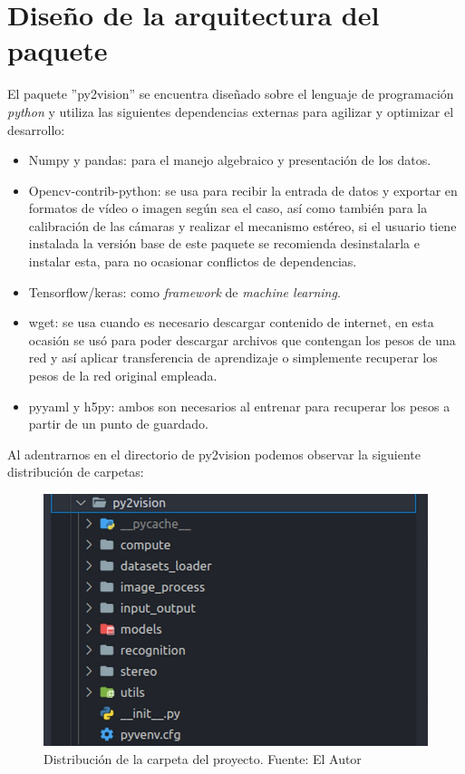 \section{Diseño de la arquitectura del paquete}
El paquete ''py2vision'' se encuentra diseñado sobre el lenguaje de programación \textit{python} y utiliza las siguientes dependencias externas para agilizar y optimizar el desarrollo:
\begin{itemize}
    \item Numpy y pandas: para el manejo algebraico y presentación de los datos.
    \item Opencv-contrib-python: se usa para recibir la entrada de datos y exportar en formatos de vídeo o imagen según sea el caso, así como también para la calibración de las cámaras y realizar el mecanismo estéreo, si el usuario tiene instalada la versión base de este paquete se recomienda desinstalarla e instalar esta, para no ocasionar conflictos de dependencias.
    \item Tensorflow/keras: como \textit{framework} de \textit{machine learning}.
    \item wget: se usa cuando es necesario descargar contenido de internet, en esta ocasión se usó para poder descargar archivos que contengan los pesos de una red y así aplicar transferencia de aprendizaje o simplemente recuperar los pesos de la red original empleada.
    \item pyyaml y h5py: ambos son necesarios al entrenar para recuperar los pesos a partir de un punto de guardado.
\end{itemize}
Al adentrarnos en el directorio de py2vision podemos observar la siguiente distribución de carpetas:
\begin{figure}[H]
    \centering
    \includegraphics[scale=0.4]{Recursos/pytwovision_folder.jpg}
    \caption[Distribución de la carpeta del proyecto.]{Distribución de la carpeta del proyecto. {\footnotesize Fuente: El Autor}}
    \label{pytwovision_folder}
\end{figure}

